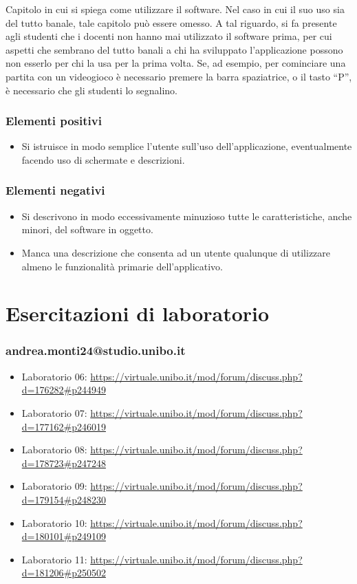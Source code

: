 \documentclass[a4paper,12pt]{report}
\begin{document}
Capitolo in cui si spiega come utilizzare il software. Nel caso in cui il suo uso sia del tutto
banale, tale capitolo può essere omesso.
%
A tal riguardo, si fa presente agli studenti che i docenti non hanno mai utilizzato il software
prima, per cui aspetti che sembrano del tutto banali a chi ha sviluppato l'applicazione possono non
esserlo per chi la usa per la prima volta.
%
Se, ad esempio, per cominciare una partita con un videogioco è necessario premere la barra
spaziatrice, o il tasto ``P'', è necessario che gli studenti lo segnalino.

\subsection*{Elementi positivi}

\begin{itemize}
 \item Si istruisce in modo semplice l'utente sull'uso dell'applicazione, eventualmente facendo uso di schermate e descrizioni.
\end{itemize}

\subsection*{Elementi negativi}
\begin{itemize}
 \item Si descrivono in modo eccessivamente minuzioso tutte le caratteristiche, anche minori, del software in oggetto.
 \item Manca una descrizione che consenta ad un utente qualunque di utilizzare almeno le funzionalità primarie dell'applicativo.
\end{itemize}

\chapter{Esercitazioni di laboratorio}

\subsection{andrea.monti24@studio.unibo.it}

\begin{itemize}
 \item Laboratorio 06: \url{https://virtuale.unibo.it/mod/forum/discuss.php?d=176282#p244949}
 \item Laboratorio 07: \url{https://virtuale.unibo.it/mod/forum/discuss.php?d=177162#p246019}
 \item Laboratorio 08: \url{https://virtuale.unibo.it/mod/forum/discuss.php?d=178723#p247248}
 \item Laboratorio 09: \url{https://virtuale.unibo.it/mod/forum/discuss.php?d=179154#p248230}
 \item Laboratorio 10: \url{https://virtuale.unibo.it/mod/forum/discuss.php?d=180101#p249109}
 \item Laboratorio 11: \url{https://virtuale.unibo.it/mod/forum/discuss.php?d=181206#p250502}
\end{itemize}
\end{document}

